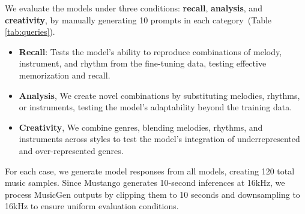 We evaluate the models under three conditions: \textbf{recall}, \textbf{analysis}, and \textbf{creativity}, by manually generating 10 prompts in each category~(Table \ref{tab:queries}).
\begin{itemize}
\setlength{\parskip}{0pt}
    \item \textbf{Recall}: Tests the model’s ability to reproduce combinations of melody, instrument, and rhythm from the fine-tuning data, testing effective memorization and recall.


    \item \textbf{Analysis}, We create novel combinations by substituting melodies, rhythms, or instruments, testing the model's adaptability beyond the training data.

    
    \item \textbf{Creativity}, We combine genres, blending melodies, rhythms, and instruments across styles to test the model's integration of underrepresented and over-represented genres.
    

    
\end{itemize}

\noindent For each case, we generate model responses from all models, creating 120 total music samples. Since Mustango generates 10-second inferences at 16kHz, we process MusicGen outputs by clipping them to 10 seconds and downsampling to 16kHz to ensure uniform evaluation conditions.

